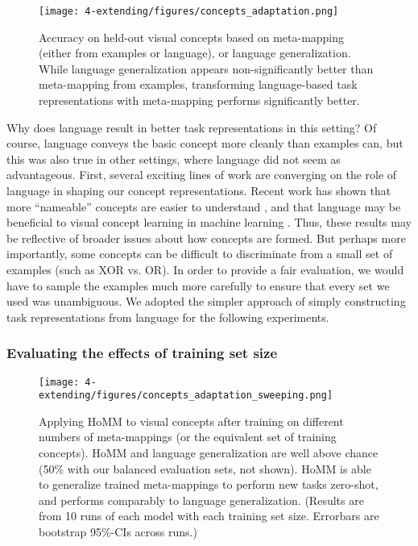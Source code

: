 \begin{figure}
\centering
\texttt{[image: 4-extending/figures/concepts\_adaptation.png]}
\caption[Accuracy on held-out visual concepts.]{Accuracy on held-out visual concepts based on meta-mapping (either from examples or language), or language generalization. While language generalization appears non-significantly better than meta-mapping from examples, transforming language-based task representations with meta-mapping performs significantly better.} \label{fig:extending_concepts_adaptation} 
\end{figure}

Why does language result in better task representations in this setting? Of course, language conveys the basic concept more cleanly than examples can, but this was also true in other settings, where language did not seem as advantageous. First, several exciting lines of work are converging on the role of language in shaping our concept representations. Recent work has shown that more ``nameable'' concepts are easier to understand \citep{Lupyan2020}, and that language may be beneficial to visual concept learning in machine learning \citep{Mu2019}. Thus, these results may be reflective of broader issues about how concepts are formed. But perhaps more importantly, some concepts can be difficult to discriminate from a small set of examples (such as XOR vs. OR). In order to provide a fair evaluation, we would have to sample the examples much more carefully to ensure that every set we used was unambiguous. We adopted the simpler approach of simply constructing task representations from language for the following experiments. \par

\subsubsection{Evaluating the effects of training set size}
\begin{figure}[htb]
\centering
\texttt{[image: 4-extending/figures/concepts\_adaptation\_sweeping.png]}
\caption[Applying HoMM to visual concepts after training on different numbers of meta-mappings.]{Applying HoMM to visual concepts after training on different numbers of meta-mappings (or the equivalent set of training concepts). HoMM and language generalization are well above chance (50\% with our balanced evaluation sets, not shown). HoMM is able to generalize trained meta-mappings to perform new tasks zero-shot, and performs comparably to language generalization. (Results are from 10 runs of each model with each training set size. Errorbars are bootstrap 95\%-CIs across runs.)} \label{fig:extending_concepts_sweeping_results}
\end{figure}

